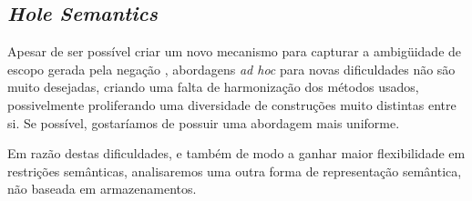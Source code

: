 \subsection{\textit{Hole Semantics}}

Apesar de ser possível criar um novo mecanismo para capturar a ambigüidade de escopo gerada pela negação , abordagens \textit{ad hoc} para novas dificuldades não são muito desejadas, criando uma falta de harmonização dos métodos usados, possivelmente proliferando uma diversidade de construções muito distintas entre si. Se possível, gostaríamos de possuir uma abordagem mais uniforme.

Em razão destas dificuldades, e também de modo a ganhar maior flexibilidade em restrições semânticas, analisaremos uma outra forma de representação semântica, não baseada em armazenamentos.